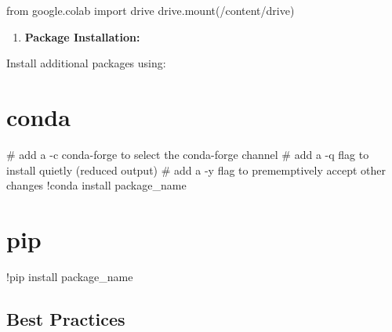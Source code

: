 \documentclass[
  letterpaper,
  DIV=11,
  numbers=noendperiod]{scrreprt}
\newenvironment{Shaded}{\begin{snugshade}}{\end{snugshade}}
\newcommand{\CommentTok}[1]{\textcolor[rgb]{0.37,0.37,0.37}{#1}}
\newcommand{\ImportTok}[1]{\textcolor[rgb]{0.00,0.46,0.62}{#1}}
\newcommand{\NormalTok}[1]{\textcolor[rgb]{0.00,0.23,0.31}{#1}}
\newcommand{\OperatorTok}[1]{\textcolor[rgb]{0.37,0.37,0.37}{#1}}
\newcommand{\StringTok}[1]{\textcolor[rgb]{0.13,0.47,0.30}{#1}}
\providecommand{\tightlist}{%
  \setlength{\itemsep}{0pt}\setlength{\parskip}{0pt}}\usepackage{longtable,booktabs,array}
\begin{document}
\begin{Shaded}
\begin{Highlighting}[]
\ImportTok{from}\NormalTok{ google.colab }\ImportTok{import}\NormalTok{ drive}
\NormalTok{drive.mount(}\StringTok{\textquotesingle{}/content/drive\textquotesingle{}}\NormalTok{)}
\end{Highlighting}
\end{Shaded}

\begin{enumerate}
\def\labelenumi{\arabic{enumi}.}
\tightlist
\item
  \textbf{Package Installation:}
\end{enumerate}

Install additional packages using:

\section{conda}

\begin{Shaded}
\begin{Highlighting}[]
\CommentTok{\# add a {-}c conda{-}forge to select the conda{-}forge channel}
\CommentTok{\# add a {-}q flag to install quietly (reduced output)}
\CommentTok{\# add a {-}y flag to prememptively accept other changes}
\OperatorTok{!}\NormalTok{conda install package\_name}
\end{Highlighting}
\end{Shaded}

\section{pip}

\begin{Shaded}
\begin{Highlighting}[]
\OperatorTok{!}\NormalTok{pip install package\_name}
\end{Highlighting}
\end{Shaded}

\hypertarget{best-practices}{%
\subsection{Best Practices}\label{best-practices}}
\end{document}
